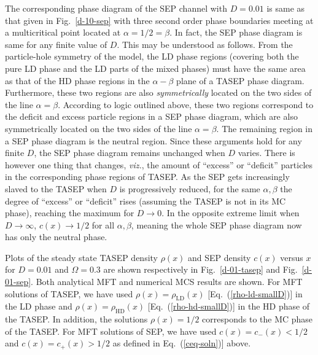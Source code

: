 \documentclass[aps,pre,twocolumn,superscriptaddress,amsmath,amssymb,longbibliography,floatfix]{revtex4}
\begin{document}
{The corresponding phase diagram of the SEP channel with $D=0.01$ is same as that given in Fig.~\ref{d-10-sep} with three second order phase boundaries meeting at a multicritical point located at $\alpha=1/2=\beta$. In fact, the SEP phase diagram is same for any finite value of $D$. This may be understood as follows. From the particle-hole symmetry of the model, the LD phase regions (covering both the pure LD phase and the LD parts of the mixed phases) must have the same area as that of the HD phase regions in the $\alpha-\beta$ plane of a TASEP phase diagram. Furthermore, these two regions are also {\em symmetrically} located on the two sides of the line $\alpha=\beta$. According to logic outlined above, these two regions correspond to the deficit and excess particle regions in a SEP phase diagram, which are also symmetrically located on the two sides of the line $\alpha=\beta$. The remaining region in a SEP phase diagram is the neutral region. Since these arguments hold for any finite $D$, the SEP phase diagram remains unchanged when $D$ varies. There is however one thing that changes, {\em viz.}, the amount of ``excess'' or ``deficit'' particles in the corresponding phase regions of TASEP. As the SEP gets increasingly slaved to the TASEP when $D$ is progressively reduced, for the same $\alpha,\beta$ the degree of ``excess'' or ``deficit'' rises   (assuming the TASEP is not in its MC phase), reaching the maximum for $D\rightarrow 0$. In the opposite extreme limit when $D\rightarrow \infty$, $c(x)\rightarrow 1/2$ for all $\alpha,\beta$, meaning the whole SEP phase diagram now has only the neutral phase. 

Plots of the steady state TASEP density $\rho(x)$ and SEP density $c(x)$ versus $x$ for $D=0.01$ and $\Omega=0.3$ are shown respectively in Fig.~\ref{d-01-tasep} and Fig.~\ref{d-01-sep}. Both analytical MFT and numerical MCS results are shown. For MFT solutions of TASEP, we have used $\rho(x)=\rho_\text{LD}(x)$ [Eq.~(\ref{rho-ld-smallD})] in the LD phase and $\rho(x)=\rho_\text{HD}(x)$ [Eq.~(\ref{rho-hd-smallD})] in the HD phase of the TASEP. In addition, the solutions $\rho(x)=1/2$ corresponds to the MC phase of the TASEP. For MFT solutions of SEP, we have used $c(x)=c_-(x)<1/2$ and $c(x)=c_+(x)>1/2$ as defined in Eq.~(\ref{ceq-soln})] above.  



}
\end{document}
